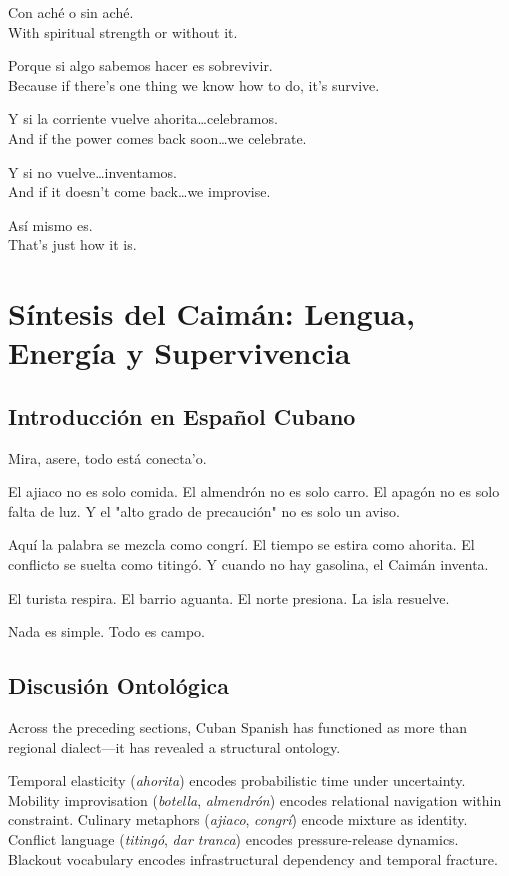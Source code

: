 \documentclass[12pt]{article}
\begin{document}
Con aché o sin aché.\\
With spiritual strength or without it.

Porque si algo sabemos hacer es sobrevivir.\\
Because if there's one thing we know how to do, it's survive.

Y si la corriente vuelve ahorita\ldots celebramos.\\
And if the power comes back soon\ldots we celebrate.

Y si no vuelve\ldots inventamos.\\
And if it doesn't come back\ldots we improvise.

Así mismo es.\\
That's just how it is.

\section{Síntesis del Caimán: Lengua, Energía y Supervivencia}

\subsection*{Introducción en Español Cubano}

Mira, asere, todo está conecta'o.

El ajiaco no es solo comida. El almendrón no es solo carro. El apagón no es solo falta de luz. Y el "alto grado de precaución" no es solo un aviso.

Aquí la palabra se mezcla como congrí. El tiempo se estira como ahorita. El conflicto se suelta como titingó. Y cuando no hay gasolina, el Caimán inventa.

El turista respira. El barrio aguanta. El norte presiona. La isla resuelve.

Nada es simple. Todo es campo.

\subsection*{Discusión Ontológica}

Across the preceding sections, Cuban Spanish has functioned as more than regional dialect---it has revealed a structural ontology.

Temporal elasticity (\textit{ahorita}) encodes probabilistic time under uncertainty. Mobility improvisation (\textit{botella}, \textit{almendrón}) encodes relational navigation within constraint. Culinary metaphors (\textit{ajiaco}, \textit{congrí}) encode mixture as identity. Conflict language (\textit{titingó}, \textit{dar tranca}) encodes pressure-release dynamics. Blackout vocabulary encodes infrastructural dependency and temporal fracture.
\end{document}
